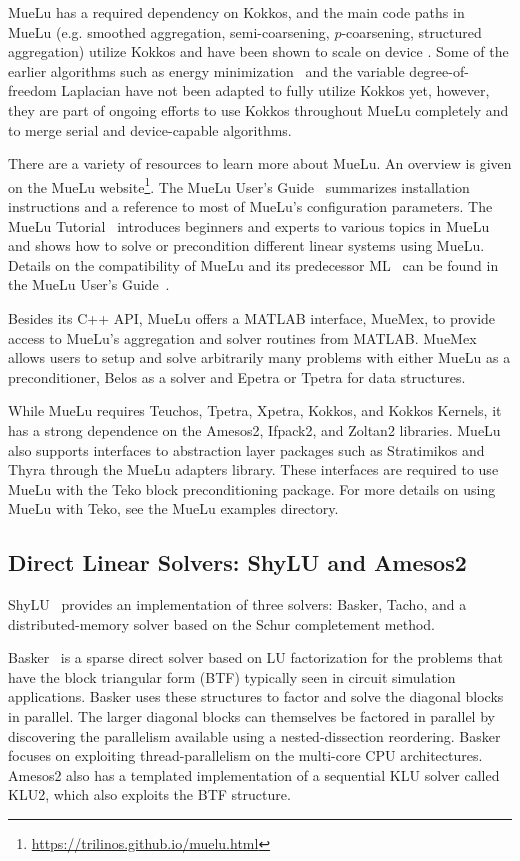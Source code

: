 MueLu has a required dependency on Kokkos,
and the main code paths in MueLu (e.g. smoothed aggregation, semi-coarsening, $p$-coarsening, structured aggregation)
utilize Kokkos and have been shown to scale on device \cite{BettencourtBrownEtAl2021_EmpirePic}.
Some of the earlier algorithms such as energy minimization~\cite{Sala2008a} and the variable degree-of-freedom Laplacian have not been adapted to fully utilize Kokkos yet,
however, they are part of ongoing efforts to use Kokkos throughout MueLu completely and to merge serial and device-capable algorithms.

There are a variety of resources to learn more about MueLu.
An overview is given on the MueLu website\footnote{\url{https://trilinos.github.io/muelu.html}}.
The MueLu User's Guide~\cite{BergerVergiat2023a} summarizes installation instructions and a reference to most of MueLu's configuration parameters.
The MueLu Tutorial~\cite{Mayr2023b} introduces beginners and experts to various topics in MueLu and shows how to solve or precondition different linear systems using MueLu.
Details on the compatibility of MueLu and its predecessor ML~\cite{Heroux2005a,Gee2006a} can be found in the MueLu User's Guide~\cite{BergerVergiat2023a}.

Besides its C++ API, MueLu offers a MATLAB interface, MueMex, to provide access to MueLu's aggregation and solver routines from MATLAB.
MueMex allows users to setup and solve arbitrarily many problems with either MueLu as a preconditioner, Belos as a solver and Epetra or Tpetra for data structures.

While MueLu requires Teuchos, Tpetra, Xpetra, Kokkos, and Kokkos Kernels, it has a strong dependence
on the Amesos2, Ifpack2, and Zoltan2 libraries.
MueLu also supports interfaces to abstraction layer packages such as Stratimikos and Thyra through the MueLu adapters library.
These interfaces are required to use MueLu with the Teko block preconditioning package.
For more details on using MueLu with Teko, see the MueLu examples directory.

\subsection{Direct Linear Solvers: ShyLU and Amesos2}

ShyLU~\cite{ShyLUCore2014} provides an implementation of three solvers: Basker, Tacho, and a distributed-memory solver based on the Schur completement method.

Basker~\cite{Basker2017} is a sparse direct solver based on LU factorization for the problems that have the block triangular form (BTF) typically seen in circuit simulation applications. Basker uses these structures to factor and solve the diagonal blocks in parallel. The larger diagonal blocks can themselves be factored in parallel by discovering the parallelism available using a nested-dissection reordering. Basker focuses on exploiting thread-parallelism on the multi-core CPU architectures. %
Amesos2 also has a templated implementation of a sequential KLU solver called KLU2, which also exploits the BTF structure.

